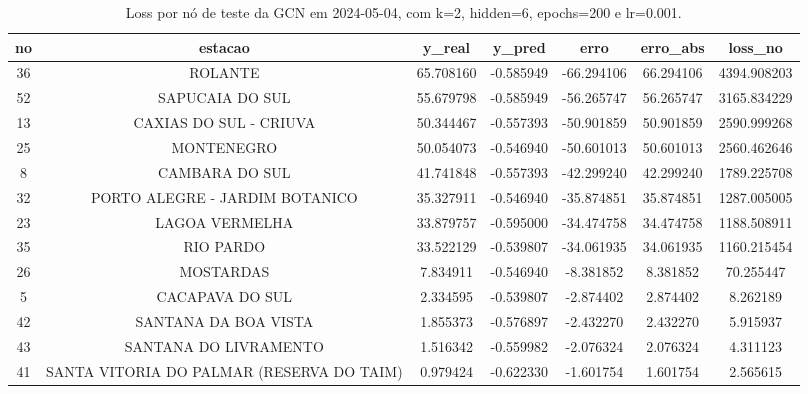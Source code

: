 \begin{table}[h]
\centering
\caption{Loss por nó de teste da GCN em 2024-05-04, com k=2, hidden=6, epochs=200 e lr=0.001.}
\label{tab:gcn_loss_nodes_k2_hidden6}
\begin{tabular}{ccccccc}
\toprule
no & estacao & y\_real & y\_pred & erro & erro\_abs & loss\_no \\
\midrule
36 & ROLANTE & 65.708160 & -0.585949 & -66.294106 & 66.294106 & 4394.908203 \\
52 & SAPUCAIA DO SUL & 55.679798 & -0.585949 & -56.265747 & 56.265747 & 3165.834229 \\
13 & CAXIAS DO SUL - CRIUVA & 50.344467 & -0.557393 & -50.901859 & 50.901859 & 2590.999268 \\
25 & MONTENEGRO & 50.054073 & -0.546940 & -50.601013 & 50.601013 & 2560.462646 \\
8 & CAMBARA DO SUL & 41.741848 & -0.557393 & -42.299240 & 42.299240 & 1789.225708 \\
32 & PORTO ALEGRE - JARDIM BOTANICO & 35.327911 & -0.546940 & -35.874851 & 35.874851 & 1287.005005 \\
23 & LAGOA VERMELHA & 33.879757 & -0.595000 & -34.474758 & 34.474758 & 1188.508911 \\
35 & RIO PARDO & 33.522129 & -0.539807 & -34.061935 & 34.061935 & 1160.215454 \\
26 & MOSTARDAS & 7.834911 & -0.546940 & -8.381852 & 8.381852 & 70.255447 \\
5 & CACAPAVA DO SUL & 2.334595 & -0.539807 & -2.874402 & 2.874402 & 8.262189 \\
42 & SANTANA DA BOA VISTA & 1.855373 & -0.576897 & -2.432270 & 2.432270 & 5.915937 \\
43 & SANTANA DO LIVRAMENTO & 1.516342 & -0.559982 & -2.076324 & 2.076324 & 4.311123 \\
41 & SANTA VITORIA DO PALMAR (RESERVA DO TAIM) & 0.979424 & -0.622330 & -1.601754 & 1.601754 & 2.565615 \\
\bottomrule
\end{tabular}
\end{table}
